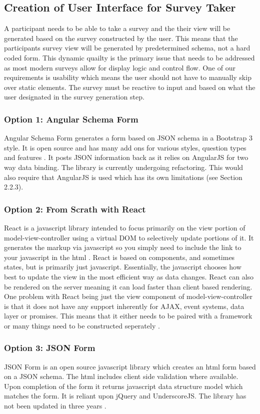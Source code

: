 \documentclass[letterpaper,10pt,serif, draftclsnofoot,onecolumn, compsoc, titlepage]{IEEEtran}
\begin{document}
\subsection{Creation of User Interface for Survey Taker}
A participant needs to be able to take a survey and the their view will be generated based on the survey constructed by the user. This means that the participants survey view will be generated by predetermined schema, not a hard coded form. This dynamic
quailty is the primary issue that needs to be addressed as most modern surveys allow for display logic and control flow. One of our requirements is usability which means the user should not have to manually skip over static elements. The survey 
must be reactive to input and based on what the user designated in the survey generation step. 
\subsubsection{Option 1: Angular Schema Form}
Angular Schema Form generates a form based on JSON schema in a Bootstrap 3 style. It is open source and has many add ons for various styles, question types and features \cite{schemaio}. It posts JSON information back as it relies on AngularJS for two way data binding. The library is currently undergoing refactoring\cite{gitSchema}. This would also require that AngularJS is used which has its own limitations (see Section 2.2.3).
\subsubsection{Option 2: From Scrath with React}
React is a javascript library intended to focus primarily on the view portion of model-view-controller using a virtual DOM to selectively update portions of it. It generates the markup via javascript so you simply need to include the link to your javascript in the html \cite{react}. React is based on components, and sometimes states, but is primarily just javascript. Essentially, the javascript chooses how best to update the view in the most efficient way as data changes. React can also be rendered on the server meaning it can load faster than client based rendering. One problem with React
 being just the view component of model-view-controller is that it does not have any support inherently for AJAX, event systems, 
 data layer or promises. This means that it either needs to be paired with a framework or many things need to be constructed seperately \cite{reactStupid}. 
\subsubsection{Option 3: JSON Form}
JSON Form is an open source javascript library which creates an html form based on a JSON schema. The html includes client side validation where available. Upon completion of the form it returns javascript data structure model which matches the form. It is reliant upon jQuery and UnderscoreJS. The library has not been updated in three years \cite{jsonForm}. 
\end{document}

